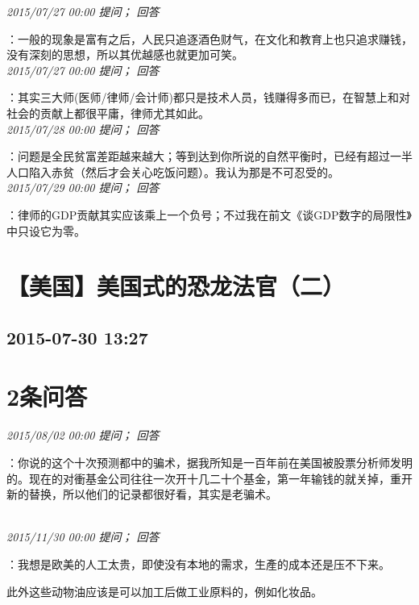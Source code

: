 \documentclass[twocolumn]{ctexart}
\begin{document}
\textit{\hfill\noindent\small 2015/07/27 00:00 提问； 回答}

：一般的现象是富有之后，人民只追逐酒色财气，在文化和教育上也只追求赚钱，没有深刻的思想，所以其优越感也就更加可笑。\\

\textit{\hfill\noindent\small 2015/07/27 00:00 提问； 回答}

：其实三大师(医师/律师/会计师)都只是技术人员，钱赚得多而已，在智慧上和对社会的贡献上都很平庸，律师尤其如此。\\

\textit{\hfill\noindent\small 2015/07/28 00:00 提问； 回答}

：问题是全民贫富差距越来越大；等到达到你所说的自然平衡时，已经有超过一半人口陷入赤贫（然后才会关心吃饭问题）。我认为那是不可忍受的。\\

\textit{\hfill\noindent\small 2015/07/29 00:00 提问； 回答}

：律师的GDP贡献其实应该乘上一个负号；不过我在前文《谈GDP数字的局限性》中只设它为零。\\


\section{【美国】美国式的恐龙法官（二）}
\subsection{2015-07-30 13:27}


\section{2条问答}

\textit{\hfill\noindent\small 2015/08/02 00:00 提问； 回答}

：你说的这个十次预测都中的骗术，据我所知是一百年前在美国被股票分析师发明的。现在的对衝基金公司往往一次开十几二十个基金，第一年输钱的就关掉，重开新的替换，所以他们的记录都很好看，其实是老骗术。

\\

\textit{\hfill\noindent\small 2015/11/30 00:00 提问； 回答}

：我想是欧美的人工太贵，即使没有本地的需求，生產的成本还是压不下来。

此外这些动物油应该是可以加工后做工业原料的，例如化妆品。\\
\end{document}
